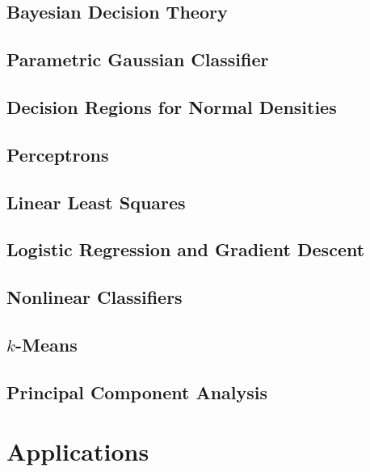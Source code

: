 \documentclass{book}
\begin{document}
\chapter{Bayesian Decision Theory}


\chapter{Parametric Gaussian Classifier}


\chapter{Decision Regions for Normal Densities}


\chapter{Perceptrons}


\chapter{Linear Least Squares}


\chapter{Logistic Regression and Gradient Descent}


\chapter{Nonlinear Classifiers}


\chapter{$k$-Means}


\chapter{Principal Component Analysis}


\part{Applications}
\end{document}
